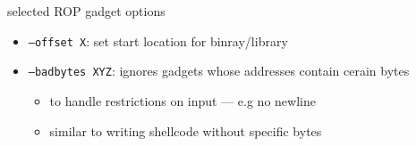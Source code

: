 \begin{frame}{selected ROP gadget options}
    \begin{itemize}
    \item {\tt --offset X}: set start location for binray/library
    \item {\tt --badbytes XYZ}: ignores gadgets whose addresses contain cerain bytes
        \begin{itemize}
        \item to handle restrictions on input --- e.g no newline
        \item similar to writing shellcode without specific bytes
        \end{itemize}
    \end{itemize}
\end{frame}
